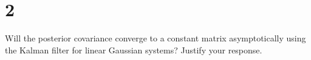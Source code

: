 \section{2}

Will the posterior covariance converge to a constant matrix asymptotically using the Kalman filter for linear Gaussian systems? Justify your response.

